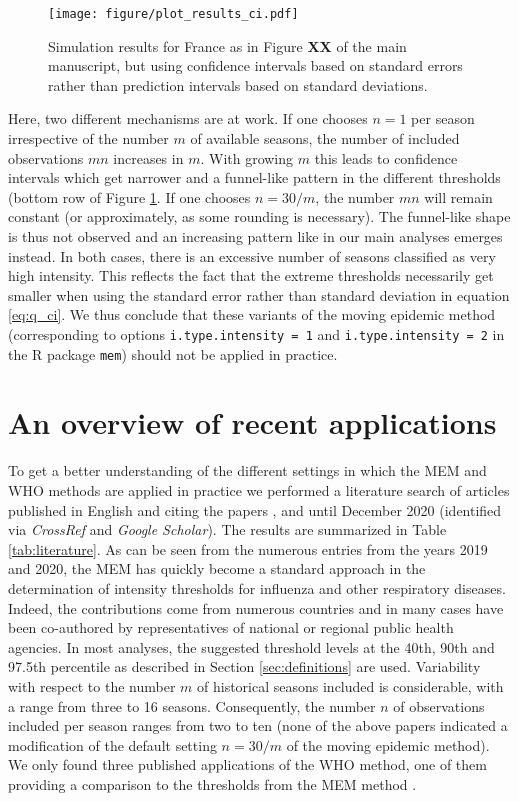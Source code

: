 \documentclass{article}
\begin{document}
\begin{figure}[h!]
\texttt{[image: figure/plot\_results\_ci.pdf]}
\caption{Simulation results for France as in Figure \textbf{XX} of the main manuscript, but using confidence intervals based on standard errors rather than prediction intervals based on standard deviations.}
\label{fig:france_ci}
\end{figure}

Here, two different mechanisms are at work. If one chooses $n = 1$ per season irrespective of the number $m$ of available seasons, the number of included observations $mn$ increases in $m$. With growing $m$ this leads to confidence intervals which get narrower and a funnel-like pattern in the different thresholds (bottom row of Figure \ref{fig:france_ci}. If one chooses $n = 30/m$, the number $mn$ will remain constant (or approximately, as some rounding is necessary). The funnel-like shape is thus not observed and an increasing pattern like in our main analyses emerges instead. In both cases, there is an excessive number of seasons classified as very high intensity. This reflects the fact that the extreme thresholds necessarily get smaller when using the standard error rather than standard deviation in equation \eqref{eq:q_ci}. We thus conclude that these variants of the moving epidemic method (corresponding to options \texttt{i.type.intensity = 1} and  \texttt{i.type.intensity = 2} in the R package \texttt{mem}) should not be applied in practice.

\section{An overview of recent applications}
\label{sec:recent_applications}

To get a better understanding of the different settings in which the MEM and WHO methods are applied in practice we performed a literature search of articles published in English and citing the papers \cite{Vega2015}, \cite{WHO2014} and \cite{WHO2017} until December 2020 (identified via \textit{CrossRef} and \textit{Google Scholar}). The results are summarized in Table \ref{tab:literature}. As can be seen from the numerous entries from the years 2019 and 2020, the MEM has quickly become a standard approach in the determination of intensity thresholds for influenza and other respiratory diseases. Indeed, the contributions come from numerous countries and in many cases have been co-authored by representatives of national or regional public health agencies. In most analyses, the suggested threshold levels at the 40th, 90th and 97.5th percentile as described in Section \ref{sec:definitions} are used. Variability with respect to the number $m$ of historical seasons included is considerable, with a range from three to 16 seasons. Consequently, the number $n$ of observations included per season ranges from two to ten (none of the above papers indicated a modification of the default setting $n = 30/m$ of the moving epidemic method). We only found three published applications of the WHO method, one of them providing a comparison to the thresholds from the MEM method \citep{Rguig2020}.
\end{document}
